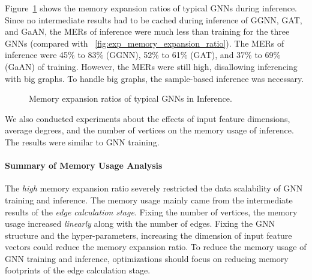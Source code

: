 Figure~\ref{fig:memory_usage_analysis} shows the memory expansion ratios of typical GNNs during inference.
%
Since no intermediate results had to be cached during inference of GGNN, GAT, and GaAN,
the MERs of inference were much less than training for the three GNNs (compared with \figurename~\ref{fig:exp_memory_expansion_ratio}).
%
The MERs of inference were 45\% to 83\% (GGNN), 52\% to 61\% (GAT), and 37\% to 69\% (GaAN) of training.
%
However, the MERs were still high, disallowing inferencing with big graphs.
%
To handle big graphs, the sample-based inference was necessary.

\begin{figure}[H]
   \centering
   \caption{Memory expansion ratios of typical GNNs in Inference.}
   \label{fig:memory_usage_analysis}
\end{figure}

%
We also conducted experiments about the effects of input feature dimensions, average degrees, and the number of vertices on the memory usage of inference.
%
The results were similar to GNN training.
%

\paragraph{Summary of Memory Usage Analysis}
%
The \emph{high} memory expansion ratio severely restricted the data scalability of GNN training and inference.
%
The memory usage mainly came from the intermediate results of the \emph{edge calculation stage}.
%
Fixing the number of vertices, the memory usage increased \emph{linearly} along with the number of edges.
%
Fixing the GNN structure and the hyper-parameters, increasing the dimension of input feature vectors could reduce the memory expansion ratio.
%
To reduce the memory usage of GNN training and inference, optimizations should focus on reducing memory footprints of the edge calculation stage.

